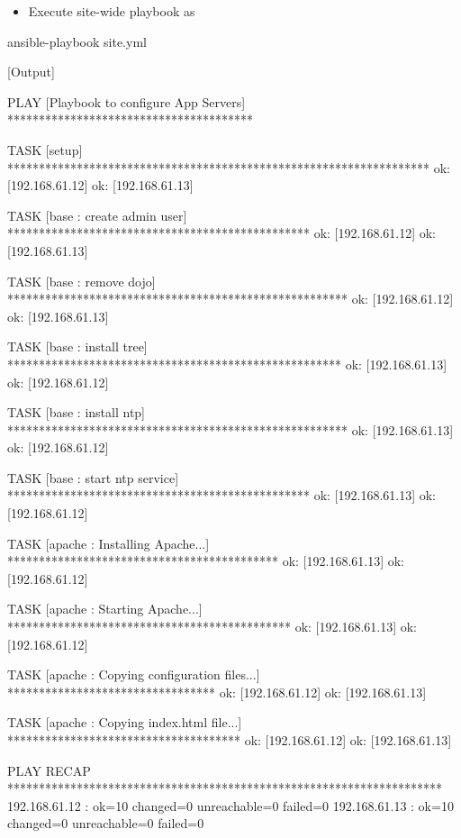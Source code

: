 \begin{itemize}
\item Execute site-wide playbook as
\end{itemize}

\begin{code}
ansible-playbook site.yml
\end{code}

[Output]\newline
\begin{code}
PLAY [Playbook to configure App Servers] ***************************************

TASK [setup] *******************************************************************
ok: [192.168.61.12]
ok: [192.168.61.13]

TASK [base : create admin user] ************************************************
ok: [192.168.61.12]
ok: [192.168.61.13]

TASK [base : remove dojo] ******************************************************
ok: [192.168.61.12]
ok: [192.168.61.13]

TASK [base : install tree] *****************************************************
ok: [192.168.61.13]
ok: [192.168.61.12]

TASK [base : install ntp] ******************************************************
ok: [192.168.61.13]
ok: [192.168.61.12]

TASK [base : start ntp service] ************************************************
ok: [192.168.61.13]
ok: [192.168.61.12]

TASK [apache : Installing Apache...] *******************************************
ok: [192.168.61.13]
ok: [192.168.61.12]

TASK [apache : Starting Apache...] *********************************************
ok: [192.168.61.13]
ok: [192.168.61.12]

TASK [apache : Copying configuration files...] *********************************
ok: [192.168.61.12]
ok: [192.168.61.13]

TASK [apache : Copying index.html file...] *************************************
ok: [192.168.61.12]
ok: [192.168.61.13]

PLAY RECAP *********************************************************************
192.168.61.12              : ok=10   changed=0    unreachable=0    failed=0
192.168.61.13              : ok=10   changed=0    unreachable=0    failed=0
\end{code}

